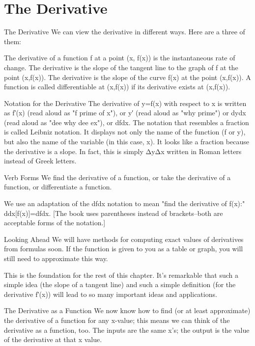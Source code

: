 \section{The Derivative}
\label{sec:derivative}

The Derivative
We can view the derivative in different ways. Here are a three of them:

The derivative of a function f at a point (x, f(x)) is the instantaneous rate of change.
The derivative is the slope of the tangent line to the graph of f at the point (x,f(x)).
The derivative is the slope of the curve f(x) at the point (x,f(x)).
A function is called differentiable at (x,f(x)) if its derivative exists at (x,f(x)).

Notation for the Derivative
The derivative of y=f(x) with respect to x is written as
f′(x)
(read aloud as "f prime of x"), or
y′
(read aloud as "why prime") or
dydx
(read aloud as "dee why dee ex"), or
dfdx.
The notation that resembles a fraction is called Leibniz notation. It displays not only the name of the function (f or y), but also the name of the variable (in this case, x). It looks like a fraction because the derivative is a slope. In fact, this is simply ΔyΔx written in Roman letters instead of Greek letters.

Verb Forms
We find the derivative of a function, or take the derivative of a function, or differentiate a function.

We use an adaptation of the dfdx notation to mean "find the derivative of f(x):"
ddx[f(x)]=dfdx.
[The book uses parentheses instead of brackets–both are acceptable forms of the notation.]


Looking Ahead
We will have methods for computing exact values of derivatives from formulas soon. If the function is given to you as a table or graph, you will still need to approximate this way.

This is the foundation for the rest of this chapter. It’s remarkable that such a simple idea (the slope of a tangent line) and such a simple definition (for the derivative f′(x)) will lead to so many important ideas and applications.


The Derivative as a Function
We now know how to find (or at least approximate) the derivative of a function for any x-value; this means we can think of the derivative as a function, too. The inputs are the same x’s; the output is the value of the derivative at that x value.

